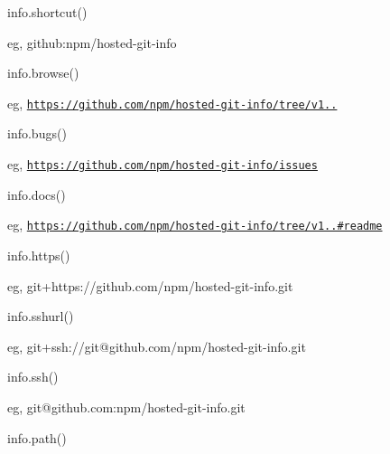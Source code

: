 \begin{DoxyItemize}
\item info.\+shortcut()
\end{DoxyItemize}

eg, {\ttfamily github\+:npm/hosted-\/git-\/info}


\begin{DoxyItemize}
\item info.\+browse()
\end{DoxyItemize}

eg, {\ttfamily \href{https://github.com/npm/hosted-git-info/tree/v1.2.0}{\tt https\+://github.\+com/npm/hosted-\/git-\/info/tree/v1..}}


\begin{DoxyItemize}
\item info.\+bugs()
\end{DoxyItemize}

eg, {\ttfamily \href{https://github.com/npm/hosted-git-info/issues}{\tt https\+://github.\+com/npm/hosted-\/git-\/info/issues}}


\begin{DoxyItemize}
\item info.\+docs()
\end{DoxyItemize}

eg, {\ttfamily \href{https://github.com/npm/hosted-git-info/tree/v1.2.0#readme}{\tt https\+://github.\+com/npm/hosted-\/git-\/info/tree/v1..\#readme}}


\begin{DoxyItemize}
\item info.\+https()
\end{DoxyItemize}

eg, {\ttfamily git+https\+://github.com/npm/hosted-\/git-\/info.\+git}


\begin{DoxyItemize}
\item info.\+sshurl()
\end{DoxyItemize}

eg, {\ttfamily git+ssh\+://git@github.\+com/npm/hosted-\/git-\/info.git}


\begin{DoxyItemize}
\item info.\+ssh()
\end{DoxyItemize}

eg, {\ttfamily git@github.\+com\+:npm/hosted-\/git-\/info.\+git}


\begin{DoxyItemize}
\item info.\+path()
\end{DoxyItemize}

